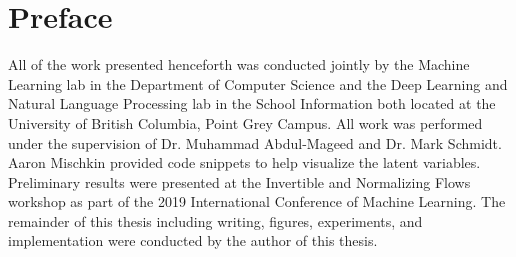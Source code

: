 
\chapter{Preface}

All of the work presented henceforth was conducted jointly by the Machine Learning lab in the Department of Computer Science and the Deep Learning and Natural Language Processing lab in the School Information both located at the University of British Columbia, Point Grey Campus. All work was performed under the supervision of Dr. Muhammad Abdul-Mageed and Dr. Mark Schmidt. Aaron Mischkin provided code snippets to help visualize the latent variables. Preliminary results were presented at the Invertible and Normalizing Flows workshop as part of the 2019 International Conference of Machine Learning. The remainder of this thesis including writing, figures, experiments, and implementation were conducted by the author of this thesis.

